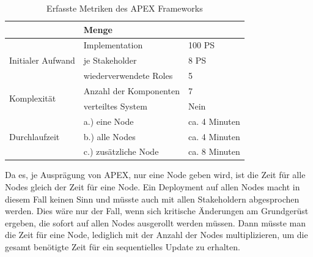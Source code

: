 \begin{table}[ht]
\setlength{\tabcolsep}{5pt}
\renewcommand{\arraystretch}{1.5}
\centering
\begin{tabular}{|l|l|l|}
\hline
\rowcolor[HTML]{C0C0C0}
\multicolumn{2}{|c|}{\textbf{Metrik}} & \textbf{Menge}					\\ 
\hline
\multirow{3}{*}{Initialer Aufwand}	& Implementation & 100 PS	\\ 
\cline{2-3}
									& je Stakeholder & 8 PS \\
\cline{2-3}
									& wiederverwendete Roles & 5		\\
\hline 
\multirow{2}{*}{Komplexität}			& Anzahl der Komponenten & 7		\\
\cline{2-3}
									& verteiltes System		& Nein 		\\
\hline
\multirow{3}{*}{Durchlaufzeit} & a.) eine Node		& ca. 4 Minuten	\\ 
\cline{2-3} 
									& b.) alle Nodes		& ca. 4 Minuten	\\ 
\cline{2-3}							
									& c.) zusätzliche Node	& ca. 8 Minuten \\
\hline
\end{tabular} 
\caption{Erfasste Metriken des APEX Frameworks}
\label{tab:metric:apex}
\end{table}

Da es, je Ausprägung von APEX, nur eine Node geben wird, ist die Zeit für alle Nodes gleich der Zeit für eine Node. Ein Deployment auf allen Nodes macht in diesem Fall keinen Sinn und müsste auch mit allen Stakeholdern abgesprochen werden. Dies wäre nur der Fall, wenn sich kritische Änderungen am Grundgerüst ergeben, die sofort auf allen Nodes ausgerollt werden müssen. Dann müsste man die Zeit für eine Node, lediglich mit der Anzahl der Nodes multiplizieren, um die gesamt benötigte Zeit für ein sequentielles Update zu erhalten.
